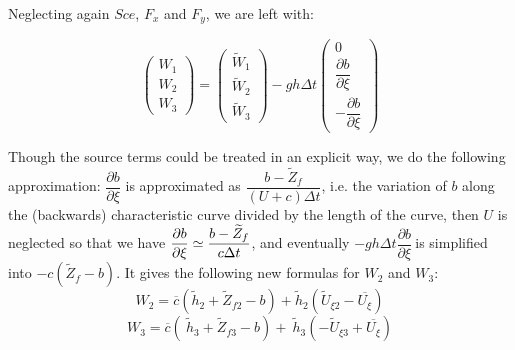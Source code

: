 Neglecting again $Sce$, $F_{x}$ and $F_{y}$, we are left with:

\begin{equation*}
\left( 
\begin{array}{c}
W_{1} \\ 
W_{2} \\ 
W_{3}%
\end{array}
\right) =\left( 
\begin{array}{c}
\widetilde{W}_{1} \\ 
\widetilde{W}_{2} \\ 
\widetilde{W}_{3}%
\end{array}
\right) -gh\Delta t\left( 
\begin{array}{c}
0 \\ 
\dfrac{\partial b}{\partial \xi } \\ 
-\dfrac{\partial b}{\partial \xi }%
\end{array}
\right)
\end{equation*}

Though the source terms could be treated in an explicit way, we do the
following approximation: $\dfrac{\partial b}{\partial \xi }$ is
approximated as $\dfrac{b-\widetilde{Z}_{f}}{(U+c)\Delta t}$, i.e. the
variation of $b$ along the (backwards) characteristic curve divided by
the length of the curve, then $U$ is neglected so that we have $\dfrac{%
\partial b}{\partial \xi }\simeq \dfrac{b-\widetilde{Z}_{f}}{c\Delta
t}$, and eventually $-gh\Delta t\dfrac{\partial b}{\partial \xi }\ $is
simplified into $-c(\widetilde{Z}_{f}-b)$. It gives the following new
formulas for $W_{2}$ and $W_{3}$: 
\begin{equation*}
W_{2}=\overline{c}(\widetilde{h}_{2}+\widetilde{Z}_{f2}-b)+\widetilde{h}%
_{2}(\widetilde{U}_{\xi 2}-\overline{U_{\xi }})
\end{equation*}
\begin{equation*}
W_{3}=\overline{c}(\ \widetilde{h}_{3}+\widetilde{Z}_{f3}-b)+\ 
\widetilde{h}_{3}(-\widetilde{U}_{\xi 3}+\overline{U_{\xi }})
\end{equation*}


